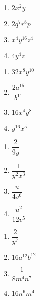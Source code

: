 \begin{multicols}{4}
\begin{enumerate}
\setcounter{enumi}{\value{HW}}

\item $2 x^2 y$
\item $2 q^7 r^8 p$
\item $x^4 y^{16} z^4$
\item $4 y^4 z$

\setcounter{HW}{\value{enumi}}
\end{enumerate}
\end{multicols}

\begin{multicols}{4}
\begin{enumerate}
\setcounter{enumi}{\value{HW}}

\item $32 x^8 y^{10}$
\item $\dfrac{2 a^{15}}{b^{11}}$
\item $16 x^4 y^8$
\item $y^{16} x^5$

\setcounter{HW}{\value{enumi}}
\end{enumerate}
\end{multicols}

\begin{multicols}{4}
\begin{enumerate}
\setcounter{enumi}{\value{HW}}

\item $\dfrac{2}{9 y}$
\item $\dfrac{1}{y^2 x^3}$
\item $\dfrac{u}{4 v^6}$
\item $\dfrac{u^2}{12 v^5}$

\setcounter{HW}{\value{enumi}}
\end{enumerate}
\end{multicols}

\begin{multicols}{4}
\begin{enumerate}
\setcounter{enumi}{\value{HW}}

\item $\dfrac{2}{y^7}$
\item $16 a^{12} b^{12}$
\item $\dfrac{1}{8 m^4 n^7}$
\item $16 n^6 m^4$

\setcounter{HW}{\value{enumi}}
\end{enumerate}
\end{multicols}

